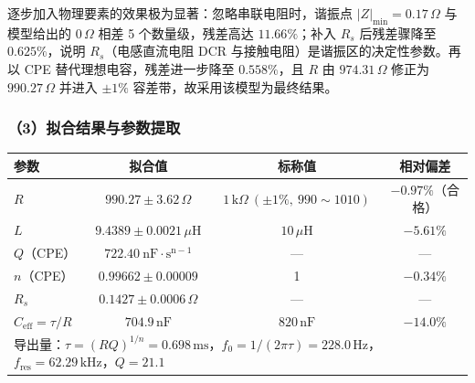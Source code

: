\documentclass[12pt,a4paper]{ctexart}
\begin{document}
\begin{table}[htbp]\centering\small
{}
\end{table}

逐步加入物理要素的效果极为显著：忽略串联电阻时，谐振点 $|Z|_{\min}=0.17\,\Omega$ 与模型给出的 $0\,\Omega$ 相差 5 个数量级，残差高达 $11.66\%$；补入 $R_s$ 后残差骤降至 $0.625\%$，说明 $R_s$（电感直流电阻 DCR 与接触电阻）是谐振区的决定性参数。再以 CPE 替代理想电容，残差进一步降至 $0.558\%$，且 $R$ 由 $974.31\,\Omega$ 修正为 $990.27\,\Omega$ 并进入 $\pm1\%$ 容差带，故采用该模型为最终结果。

\subsubsection*{（3）拟合结果与参数提取}
\begin{table}[htbp]\centering\small
\begin{tabular}{l|c|c|c}
\hline
参数 & 拟合值 & 标称值 & 相对偏差 \\
\hline
$R$ & $990.27\pm3.62\,\Omega$ & $1\,\mathrm{k}\Omega\ (\pm1\%,\ 990\sim1010)$ & $-0.97\%$（合格） \\
$L$ & $9.4389\pm0.0021\,\mu\mathrm{H}$ & $10\,\mu\mathrm{H}$ & $-5.61\%$ \\
$Q$（CPE） & $722.40\ \mathrm{nF\cdot s^{n-1}}$ & — & — \\
$n$（CPE） & $0.99662\pm0.00009$ & 1 & $-0.34\%$ \\
$R_s$ & $0.1427\pm0.0006\,\Omega$ & — & — \\
$C_{\mathrm{eff}}=\tau/R$ & $704.9\,\mathrm{nF}$ & $820\,\mathrm{nF}$ & $-14.0\%$ \\
\hline
\multicolumn{4}{l}{导出量：$\tau=(RQ)^{1/n}=0.698\,\mathrm{ms}$，$f_0=1/(2\pi\tau)=228.0\,\mathrm{Hz}$，$f_{\mathrm{res}}=62.29\,\mathrm{kHz}$，$Q=21.1$}
\end{tabular}
\end{table}
\end{document}
